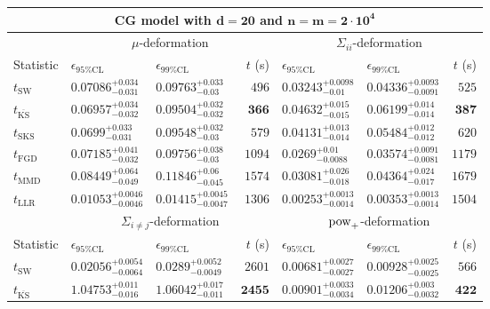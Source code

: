 \begin{tabular}{l|llr|llr}
	\toprule
	\multicolumn{7}{c}{{\bf CG model with $\mathbf{d=20}$ and $\mathbf{n=m=2\cdot 10^{4}}$}} \\
	\toprule
	\multicolumn{1}{c}{} & \multicolumn{3}{c}{$\mu$-deformation} & \multicolumn{3}{c}{$\Sigma_{ii}$-deformation} \\
	Statistic & $\epsilon_{95\%\mathrm{CL}}$ & $\epsilon_{99\%\mathrm{CL}}$ & $t$ (s) & $\epsilon_{95\%\mathrm{CL}}$ & $\epsilon_{99\%\mathrm{CL}}$ & $t$ (s) \\
	\midrule
	$t_{\mathrm{SW}}$ & $0.07086_{-0.031}^{+0.034}$ & $0.09763_{-0.03}^{+0.033}$ & $496$ & $0.03243_{-0.01}^{+0.0098}$ & $0.04336_{-0.0091}^{+0.0093}$ & $525$ \\
	$t_{\overline{\mathrm{KS}}}$ & ${\mathbf{0.06957_{-0.032}^{+0.034}}}$ & ${\mathbf{0.09504_{-0.032}^{+0.032}}}$ & ${\mathbf{366}}$ & $0.04632_{-0.015}^{+0.015}$ & $0.06199_{-0.014}^{+0.014}$ & ${\mathbf{387}}$ \\
	$t_{\mathrm{SKS}}$ & $0.0699_{-0.031}^{+0.033}$ & $0.09548_{-0.03}^{+0.032}$ & $579$ & $0.04131_{-0.014}^{+0.013}$ & $0.05484_{-0.012}^{+0.012}$ & $620$ \\
	$t_{\mathrm{FGD}}$ & $0.07185_{-0.032}^{+0.041}$ & $0.09756_{-0.03}^{+0.038}$ & $1094$ & ${\mathbf{0.0269_{-0.0088}^{+0.01}}}$ & ${\mathbf{0.03574_{-0.0081}^{+0.0091}}}$ & $1179$ \\
	$t_{\mathrm{MMD}}$ & $0.08449_{-0.049}^{+0.064}$ & $0.11846_{-0.045}^{+0.06}$ & $1574$ & $0.03081_{-0.018}^{+0.026}$ & $0.04364_{-0.017}^{+0.024}$ & $1679$ \\
	$t_{\mathrm{LLR}}$ & $0.01053_{-0.0046}^{+0.0046}$ & $0.01415_{-0.0047}^{+0.0045}$ & $1306$ & $0.00253_{-0.0014}^{+0.0013}$ & $0.00353_{-0.0014}^{+0.0013}$ & $1504$ \\
	\toprule
	\multicolumn{1}{c}{} & \multicolumn{3}{c}{$\Sigma_{i\neq j}$-deformation} & \multicolumn{3}{c}{$\rm{pow}_{+}$-deformation} \\
	Statistic & $\epsilon_{95\%\mathrm{CL}}$ & $\epsilon_{99\%\mathrm{CL}}$ & $t$ (s) & $\epsilon_{95\%\mathrm{CL}}$ & $\epsilon_{99\%\mathrm{CL}}$ & $t$ (s) \\
	\midrule
	$t_{\mathrm{SW}}$ & $0.02056_{-0.0064}^{+0.0054}$ & $0.0289_{-0.0049}^{+0.0052}$ & $2601$ & $0.00681_{-0.0027}^{+0.0027}$ & $0.00928_{-0.0025}^{+0.0025}$ & $566$ \\
	$t_{\overline{\mathrm{KS}}}$ & $1.04753_{-0.016}^{+0.011}$ & $1.06042_{-0.011}^{+0.017}$ & ${\mathbf{2455}}$ & $0.00901_{-0.0034}^{+0.0033}$ & $0.01206_{-0.0032}^{+0.003}$ & ${\mathbf{422}}$ \\

\end{tabular}
